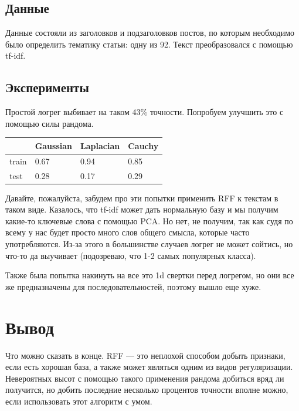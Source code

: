\documentclass{article}
\begin{document}
\subsection{Данные}
Данные состояли из заголовков и подзаголовков постов, по которым необходимо было определить тематику статьи: одну из 92. Текст преобразовался с помощью tf-idf.

\subsection{Эксперименты}

Простой логрег выбивает на таком 43\% точности. Попробуем улучшить это с помощью силы рандома.

\begin{table}[H]
\centering

\begin{tabular}{M{2.5cm}|M{2.5cm}M{2.5cm}M{2.5cm}}
     & Gaussian & Laplacian & Cauchy \\
    \hline
    train & 0.67 & 0.94 & 0.85 \\
    test & 0.28 & 0.17 & 0.29 \\
\end{tabular}

\label{tab:my_label}
\end{table}

Давайте, пожалуйста, забудем про эти попытки применить RFF к текстам в таком виде. Казалось, что tf-idf может дать нормальную базу и мы получим какие-то ключевые слова с помощью PCA. Но нет, не получим, так как судя по всему у нас будет просто много слов общего смысла, которые часто употребляются. Из-за этого в большинстве случаев логрег не может сойтись, но что-то да выучивает (подозреваю, что 1-2 самых популярных класса).

Также была попытка накинуть на все это 1d свертки перед логрегом, но они все же предназначены для последовательностей, поэтому вышло еще хуже.

\section{Вывод}

Что можно сказать в конце. RFF --- это неплохой способом добыть признаки, если есть хорошая база, а также может являться одним из видов регуляризации. Невероятных высот с помощью такого применения рандома добиться вряд ли получится, но добить последние несколько процентов точности вполне можно, если использовать этот алгоритм с умом.
\end{document}
